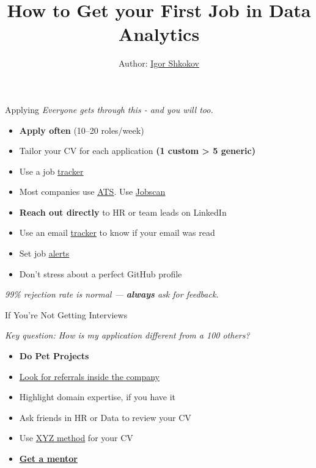 \documentclass[10pt,a4paper]{article}
\date{} %
\title{How to Get your First Job in \textbf{Data Analytics}}
\author{Author: \href{https://www.linkedin.com/in/igorshkokov/}{Igor Shkokov}}
\begin{document}
\small
\begin{multicols}{3}

\maketitle
\thispagestyle{empty}
\scriptsize

\begin{textbox}{Applying}
\emph{Everyone gets through this - and you will too.}
\begin{itemize}
  \item \textbf{Apply often} (10--20 roles/week)
  \item Tailor your CV for each application \textbf{(1 custom > 5 generic)}
  \item Use a job \href{https://huntr.co/product/job-tracker}{tracker}
  \item Most companies use \href{https://en.wikipedia.org/wiki/Applicant_tracking_system}{ATS}. Use \href{https://www.jobscan.co/}{Jobscan}
  \item \textbf{Reach out directly} to HR or team leads on LinkedIn
  \item Use an email \href{https://chromewebstore.google.com/detail/email-tracker/bnompdfnhdbgdaoanapncknhmckenfog}{tracker} to know if your email was read
  \item Set job \href{https://www.linkedin.com/jobs/jam/}{alerts}
  \item Don't stress about a perfect GitHub profile

\end{itemize}

\emph{99\% rejection rate is normal --- \textbf{always} ask for feedback.} 
\end{textbox}

\begin{textbox}{If You're Not Getting Interviews}

\emph{Key question: How is my application different from a 100 others?}

\begin{itemize}
    \item \textbf{Do Pet Projects}
    \item \href{https://www.linkedin.com/pulse/art-asking-referral-linkedin-comprehensive-guide-simon-siew-nz8ff/}{Look for referrals inside the company} 
    \item Highlight domain expertise, if you have it
    \item Ask friends in HR or Data to review your CV
    \item Use \href{https://www.tealhq.com/post/xyz-resume}{XYZ method} for your CV
    \item \href{https://adplist.org/}{\textbf{Get a mentor}}  


\end{itemize}
\end{textbox}
\end{multicols}
\end{document}
